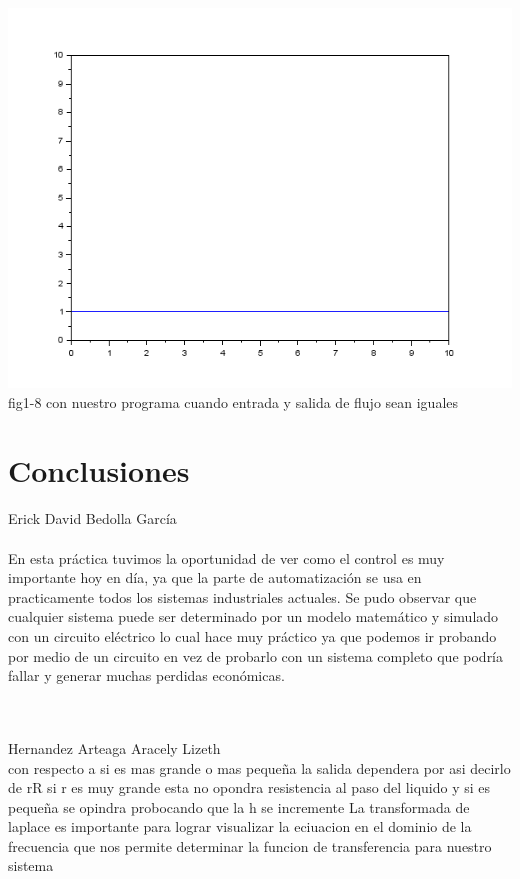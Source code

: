 \documentclass[12pt,a4paper]{IEEEtran}
\begin{document}
\begin{center}
	\includegraphics[scale = 0.4]{images/h}\\
	{fig1-8 con nuestro programa cuando entrada y salida de flujo sean iguales}
\end{center}

\section{Conclusiones}
 Erick David Bedolla García\\ \ \\
En esta práctica tuvimos la oportunidad de ver como el control es muy importante hoy en día, ya que la parte de automatización se usa en practicamente todos los sistemas industriales actuales. Se pudo observar que cualquier sistema puede ser determinado por un modelo matemático y simulado con un circuito eléctrico lo cual hace muy práctico ya que podemos ir probando por medio de un circuito en vez de probarlo con un sistema completo que podría fallar y generar muchas perdidas económicas.\\\\\

Hernandez Arteaga Aracely Lizeth\\

con respecto a si es mas grande o mas pequeña la salida dependera por asi decirlo de rR si r es muy grande esta no opondra resistencia al paso del liquido y si es pequeña se opindra probocando que la h se incremente 
La transformada de laplace es importante para lograr visualizar la eciuacion en el dominio de la frecuencia que nos permite determinar la funcion de transferencia para nuestro sistema
\end{document}
